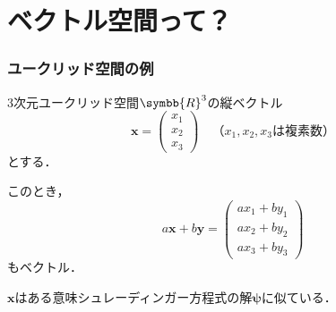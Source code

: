 \documentclass[
    10pt,
    ]{sotsu-beamer}
\begin{document}
\section{ベクトル空間って？}


\begin{frame}
    \frametitle{ユークリッド空間の例}

    3次元ユークリッド空間$\symbb{R}^3$の縦ベクトル
    \begin{equation*}
        \symbf{x} = 
        \begin{pmatrix}
            x_1 \\ x_2  \\ x_3
        \end{pmatrix}
        \quad
        \text{（$x_1, x_2, x_3$は複素数）}
    \end{equation*}
    とする．

    このとき，
    \begin{equation*}
        a \symbf{x} + b \symbf{y}
        = \begin{pmatrix}
            a x_1 + b y_1  \\
            a x_2 + b y_2  \\
            a x_3 + b y_3
        \end{pmatrix}
    \end{equation*}
    もベクトル．

    \pause

    $\symbf{x}$はある意味\alert{シュレーディンガー方程式の解$\symbf{\psi}$に似ている}．

\end{frame}
\end{document}
